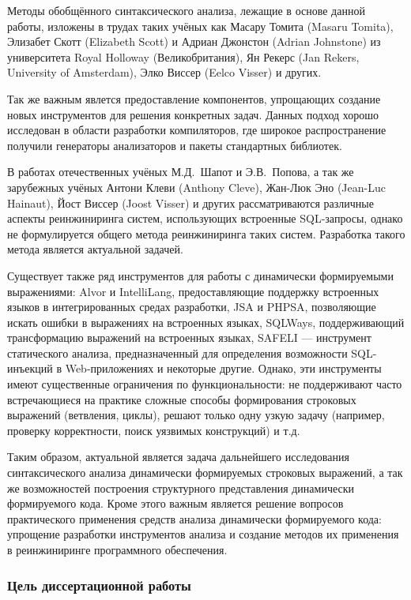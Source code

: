 Методы обобщённого синтаксического анализа, лежащие в основе данной работы, изложены в трудах таких учёных как Масару Томита (Masaru Tomita), Элизабет Скотт (Elizabeth Scott) и Адриан Джонстон (Adrian Johnstone) из университета Royal Holloway (Великобритания), Ян Рекерс (Jan Rekers, University of Amsterdam), Элко Виссер (Eelco Visser) и других.

Так же важным явлется предоставление компонентов, упрощающих создание новых инструментов для решения конкретных задач. Данных подход хорошо исследован в области разработки компиляторов, где широкое распространение получили генераторы анализаторов и пакеты стандартных библиотек. 

В работах отечественных учёных М.Д.~Шапот  и Э.В.~Попова, а так же зарубежных учёных Антони Клеви (Anthony Cleve), Жан-Люк Эно (Jean-Luc Hainaut), Йост Виссер (Joost Visser) и других рассматриваются различные аспекты реинжиниринга систем, использующих встроенные SQL-запросы, однако не формулируется общего метода реинжиниринга таких систем. Разработка такого метода является актуальной задачей.

Существует также ряд инструментов для работы с динамически формируемыми выражениями: Alvor и IntelliLang, предоставляющие поддержку встроенных языков в интегрированных средах разработки, JSA и PHPSA, позволяющие искать ошибки в выражениях на встроенных языках, SQLWays, поддерживающий трансформацию выражений на встроенных языках, SAFELI --- инструмент статического анализа, предназначенный для определения возможности SQL-инъекций в Web-приложениях и некоторые другие. Однако, эти инструменты имеют существенные ограничения по функциональности: не поддерживают часто встречающиеся на практике сложные способы формирования строковых выражений (ветвления, циклы), решают только одну узкую задачу (например, проверку корректности, поиск уязвимых конструкций) и т.д.

Таким образом, актуальной является задача дальнейшего исследования синтаксического анализа динамически формируемых строковых выражений, а так же возможностей построения структурного представления динамически формируемого кода. Кроме этого важным является решение вопросов практического применения средств анализа динамически формируемого кода: упрощение разработки инструментов анализа и создание методов их применения в реинжиниринге программного обеспечения.

\subsubsection*{\large{Цель диссертационной работы}}

